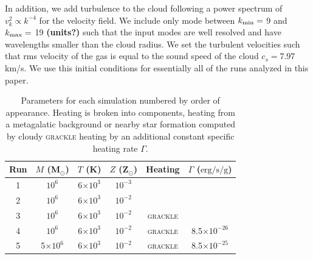\documentclass[useAMS,usenatbib]{mn2e}
\begin{document}
In addition, we add turbulence to the cloud following a power spectrum of
$v_k^2 \propto k^{-4}$ for the velocity field.  We include only mode between
$k_{\rm min}=$ 9 and $k_{\rm max} =$ 19 {\bf (units?)} such that the input modes are well resolved
and have wavelengths smaller than the cloud radius.  We set the turbulent velocities
such that rms velocity of the gas is equal to the sound speed of the cloud $c_s = 7.97$ km/s.
We use this initial conditions for essentially all of the runs analyzed in this paper.

\begin{table}
       \begin{center}
	\begin{tabular}{@{}cccccc}
	\hline
	Run & $M$ (M$_{\odot}$) & $T$ (K) & $Z$ (Z$_{\odot}$) & Heating & $\Gamma$ ($\mathrm{erg/s/g}$)\\ 
	\hline
	    1 & $10^6$ & 6$ \times 10^3$ & $10^{-3}$ \\
        2 & $10^6$ & 6$ \times 10^3$ & $10^{-2}$ \\
        3 & $10^6$ & 6$ \times 10^3$ & $10^{-2}$ & \textsc{grackle} \\ 
        4 & $10^6$ & 6$ \times 10^3$ & $10^{-2}$ & \textsc{grackle} & 8.5$ \times 10^{-26}$\\ 
        5 & 5$\times 10^6$ & 6$ \times 10^3$ & $10^{-2}$ & \textsc{grackle} & 8.5$ \times 10^{-25}$\\ 
       \hline
	\end{tabular}
	\caption{Parameters for each simulation numbered by order of appearance. Heating is broken into components, heating from
    a metagalatic background or nearby star formation computed by cloudy \textsc{grackle} heating by an additional constant specific heating rate $\Gamma$.}
	\label{table:parameters}
	\end{center}
\end{table}
\end{document}
